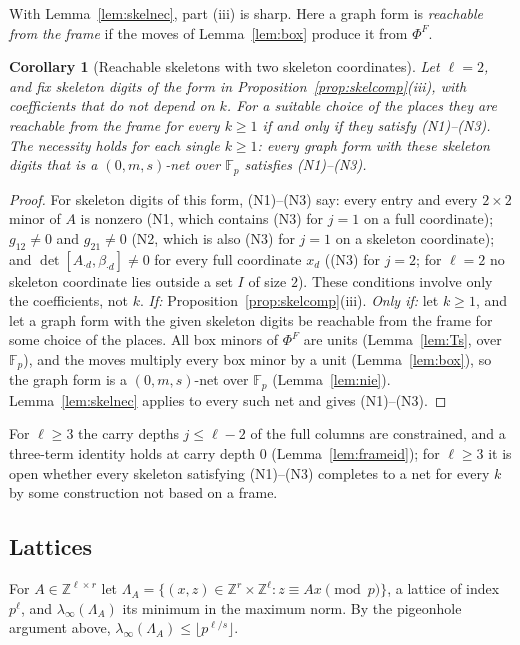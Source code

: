 \documentclass[11pt]{amsart}
\newtheorem{corollary}[theorem]{Corollary}
\theoremstyle{definition}
\theoremstyle{plain}
\newcommand{\Z}{\mathbb{Z}}
\newcommand{\F}{\mathbb{F}}
\begin{document}
With Lemma~\ref{lem:skelnec}, part (iii) is sharp. Here a graph form is \emph{reachable from the frame} if the moves of Lemma~\ref{lem:box} produce it from $\Phi^F$.

\begin{corollary}[Reachable skeletons with two skeleton coordinates]\label{cor:skelreach}
Let $\ell=2$, and fix skeleton digits of the form in Proposition~\ref{prop:skelcomp}(iii), with coefficients that do not depend on $k$. For a suitable choice of the places they are reachable from the frame for every $k\ge1$ if and only if they satisfy (N1)--(N3). The necessity holds for each single $k\ge1$: every graph form with these skeleton digits that is a $(0,m,s)$-net over $\F_p$ satisfies (N1)--(N3).
\end{corollary}

\begin{proof}
For skeleton digits of this form, (N1)--(N3) say: every entry and every $2\times2$ minor of $A$ is nonzero (N1, which contains (N3) for $j=1$ on a full coordinate); $g_{12}\ne0$ and $g_{21}\ne0$ (N2, which is also (N3) for $j=1$ on a skeleton coordinate); and $\det[A_{\cdot d},\beta_{\cdot d}]\ne0$ for every full coordinate $x_d$ ((N3) for $j=2$; for $\ell=2$ no skeleton coordinate lies outside a set $I$ of size $2$). These conditions involve only the coefficients, not $k$. \emph{If:} Proposition~\ref{prop:skelcomp}(iii). \emph{Only if:} let $k\ge1$, and let a graph form with the given skeleton digits be reachable from the frame for some choice of the places. All box minors of $\Phi^F$ are units (Lemma~\ref{lem:Ts}, over $\F_p$), and the moves multiply every box minor by a unit (Lemma~\ref{lem:box}), so the graph form is a $(0,m,s)$-net over $\F_p$ (Lemma~\ref{lem:nie}). Lemma~\ref{lem:skelnec} applies to every such net and gives (N1)--(N3).
\end{proof}

For $\ell\ge3$ the carry depths $j\le \ell-2$ of the full columns are constrained, and a three-term identity holds at carry depth $0$ (Lemma~\ref{lem:frameid}); for $\ell\ge3$ it is open whether every skeleton satisfying (N1)--(N3) completes to a net for every $k$ by some construction not based on a frame.

\subsection{Lattices}
For $A\in\Z^{\ell\times r}$ let $\Lambda_A=\{(x,z)\in\Z^r\times\Z^\ell:z\equiv Ax\pmod p\}$, a lattice of index $p^\ell$, and $\lambda_\infty(\Lambda_A)$ its minimum in the maximum norm. By the pigeonhole argument above, $\lambda_\infty(\Lambda_A)\le\lfloor p^{\ell/s}\rfloor$.
\end{document}

